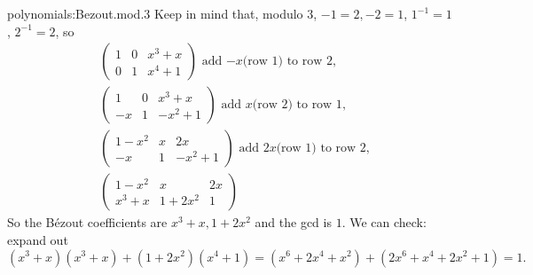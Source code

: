 \begin{answer}{polynomials:Bezout.mod.3}
Keep in mind that, modulo \(3\), \(-1=2,-2=1\), \(1^{-1}=1\), \(2^{-1}=2\), so
\begin{align*}
&
\begin{pmatrix}
1 & 0 & x^3+x \\
0 & 1 & x^4+1
\end{pmatrix} \text{ add \(-x\)(row 1) to row 2},
\\
&
\begin{pmatrix}
1 & 0 & x^3+x \\
-x & 1 & -x^2+1
\end{pmatrix} \text{ add \(x\)(row 2) to row 1},
\\
&
\begin{pmatrix}
1-x^2 & x & 2x \\
-x & 1 & -x^2+1
\end{pmatrix} \text{ add \(2x\)(row 1) to row 2},
\\
&
\begin{pmatrix}
1-x^2 & x & 2x \\
x^3+x & 1+2x^2 & 1
\end{pmatrix}
\end{align*}
So the B\'ezout coefficients are \(x^3+x,1+2x^2\) and the gcd is \(1\).
We can check: expand out
\[
(x^3+x)(x^3+x)+(1+2x^2)(x^4+1)=(x^6+2x^4+x^2)+(2x^6+x^4+2x^2+1)=1.
\]
\end{answer}




